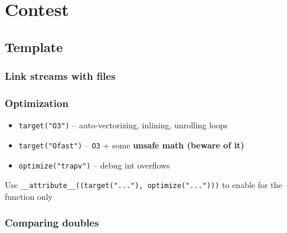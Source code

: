 \section{Contest}

\subsection{Template}


\subsubsection{Link streams with files}

\subsubsection{Optimization}

\vspace{1em}
\begin{itemize}
  \item \verb|target("O3")| -- auto-vectorizing, inlining, unrolling loops
  \item \verb|target("Ofast")| -- \verb|O3| + some \bf{unsafe} math (beware of it)
  \item \verb|optimize("trapv")| -- debug int overflows
\end{itemize}
Use \verb|__attribute__((target("..."), optimize("...")))| to enable for the function only

\subsubsection{Comparing doubles}
